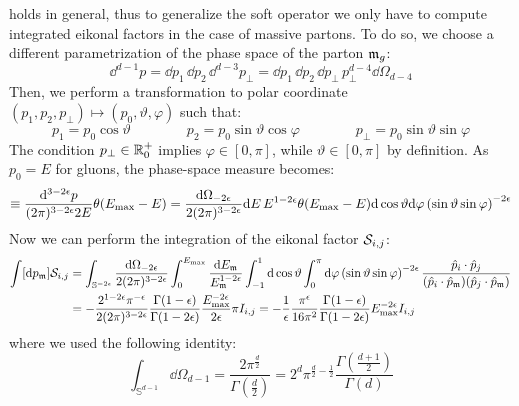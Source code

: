  holds in general, thus to generalize the soft operator we only have to compute integrated eikonal factors in the case of massive partons. To do so, we choose a different parametrization of the phase space of the parton $ \mathfrak{m}_g $:
\begin{equation}
  \dd^{d-1} p = \dd p_1 \, \dd p_2 \, \dd^{d-3} p_\perp = \dd p_1 \, \dd p_2 \, \dd p_\perp \, p_\perp^{d-4} \dd \Omega_{d-4}
\end{equation}
Then, we perform a transformation to polar coordinate $ (p_1 , p_2 , p_\perp) \mapsto (p_0 , \vartheta , \varphi) $ such that:
\begin{equation}
  p_1 = p_0 \cos \vartheta
  \qquad \qquad
  p_2 = p_0 \sin \vartheta \cos \varphi
  \qquad \qquad
  p_\perp = p_0 \sin \vartheta \sin \varphi
\end{equation}
The condition $ p_\perp \in \mathbb{R}^+_0 $ implies $ \varphi \in [0,\pi] $, while $ \vartheta \in [0,\pi] $ by definition. As $ p_0 = E $ for gluons, the phase-space measure becomes:
\begin{equation}
  [\dd p] \equiv \frac{\dd^{3-2\de}p}{(2\pi)^{3-2\de}2E} \theta(\ema - E) = \frac{\dd \Omega_{-2\de}}{2(2\pi)^{3-2\de}} \dd E\, E^{1-2\de} \theta(\ema - E) \dd \cos \vartheta \dd \varphi \left( \sin \vartheta \sin \varphi \right)^{-2\de}
\end{equation}
Now we can perform the integration of the eikonal factor $ \mathcal{S}_{i,j} $:
\begin{equation*}
  \begin{split}
    \int [\mathrm{d} p_{\mathfrak{m}}] \mathcal{S}_{i,j}
    & = \int_{\mathbb{S}^{-2\epsilon}} \frac{\mathrm{d} \Omega_{-2\epsilon}}{2(2\pi)^{3-2\epsilon}} \int_0^{E_\text{max}} \frac{\mathrm{d} E_{\mathfrak{m}}}{E_{\mathfrak{m}}^{1-2\epsilon}} \int_{-1}^1 \mathrm{d} \cos \vartheta \int_0^\pi \mathrm{d} \varphi \left( \sin \vartheta \sin \varphi \right)^{-2\epsilon} \frac{\hat{p}_i \cdot \hat{p}_j}{(\hat{p}_i \cdot \hat{p}_{\mathfrak{m}}) (\hat{p}_j \cdot \hat{p}_{\mathfrak{m}})} \\
    & = - \frac{2^{1-2\epsilon} \pi^{-\epsilon}}{2(2\pi)^{3-2\epsilon}} \frac{\Gamma(1-\epsilon)}{\Gamma(1-2\epsilon)} \frac{E_\text{max}^{-2\epsilon}}{2\epsilon} \pi I_{i,j} = - \frac{1}{\epsilon} \frac{\pi^\epsilon}{16\pi^2} \frac{\Gamma(1-\epsilon)}{\Gamma(1-2\epsilon)} E_\text{max}^{-2\epsilon} I_{i,j}
  \end{split}
\end{equation*}
where we used the following identity:
\begin{equation}
  \int_{\mathbb{S}^{d-1}} \dd \Omega_{d-1} = \frac{2 \pi^{\frac{d}{2}}}{\Gamma(\frac{d}{2})} = 2^d \pi^{\frac{d}{2} - \frac{1}{2}} \frac{\Gamma\left( \frac{d+1}{2} \right)}{\Gamma(d)}
\end{equation}
